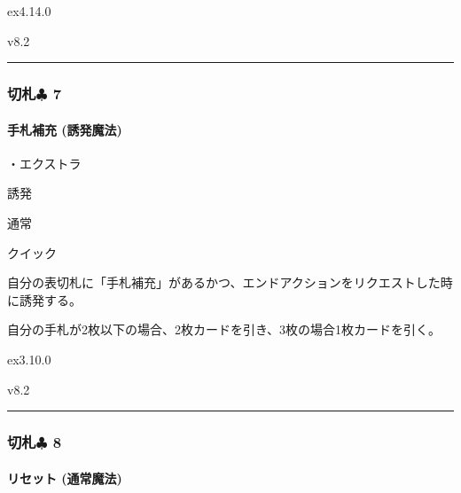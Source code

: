 \documentclass[letterpaper,10pt,dvipdfmx]{sphinxmanual}
\begin{document}
\sphinxAtStartPar
{}  ex4.14.0

\sphinxAtStartPar
{}  v8.2


\bigskip\hrule\bigskip



\subsubsection{切札{\normalsize $\clubsuit$} 7}
\label{\detokenize{auto/frameActionlist:id74}}

\paragraph{手札補充 (誘発魔法)}
\label{\detokenize{auto/frameActionlist:act-handrefill}}\label{\detokenize{auto/frameActionlist:id75}}
\sphinxAtStartPar
{}

\sphinxAtStartPar
・エクストラ

\sphinxAtStartPar
{} 誘発

\sphinxAtStartPar
{} 通常

\sphinxAtStartPar
{} クイック

\sphinxAtStartPar
{}

\sphinxAtStartPar
自分の表切札に「手札補充」があるかつ、エンドアクションをリクエストした時に誘発する。

\sphinxAtStartPar
{}

\sphinxAtStartPar
自分の手札が2枚以下の場合、2枚カードを引き、3枚の場合1枚カードを引く。

\sphinxAtStartPar
{}  ex3.10.0

\sphinxAtStartPar
{}  v8.2


\bigskip\hrule\bigskip



\subsubsection{切札{\normalsize $\clubsuit$} 8}
\label{\detokenize{auto/frameActionlist:id76}}

\paragraph{リセット (通常魔法)}
\label{\detokenize{auto/frameActionlist:act-reset}}\label{\detokenize{auto/frameActionlist:id77}}
\sphinxAtStartPar
{}
\end{document}
